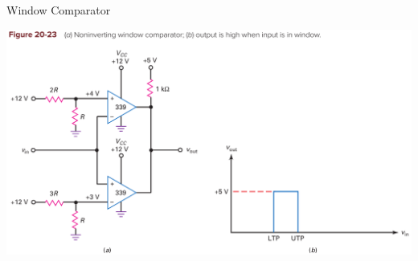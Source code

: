 \documentclass[pdflatex,compress]{beamer}
\begin{document}
\begin{frame}{Window Comparator}
	\begin{center}
		\includegraphics[width=1\linewidth]{img/2023}
	\end{center}
\end{frame}
\end{document}
